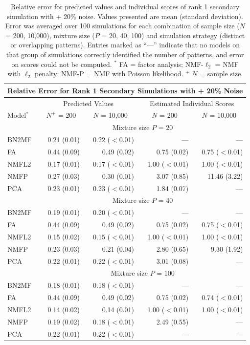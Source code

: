 \clearpage
\begingroup
\renewcommand{\arraystretch}{1.35}
\begin{table}[!htbp] \centering 
  \caption{Relative error for predicted values and individual scores of rank 1 secondary simulation with + 20\% noise. Values presented are mean (standard deviation). Error was averaged over 100 simulations for each combination of sample size ($N$ = 200, 10,000), mixture size ($P$ = 20, 40, 100) and simulation strategy (distinct or overlapping patterns). Entries marked as ``---'' indicate that no models on that group of simulations correctly identified the number of patterns, and error on scores could not be computed. $^*$ FA = factor analysis; NMF-$\ell_2$ = NMF with $\ell_2$ penalty; NMF-P = NMF with Poisson likelihood. $^+$ $N$ = sample size.}
  \label{table:sup1} 
 \addtolength{\tabcolsep}{-2pt}
\begin{tabular}{lrr|rr}
\multicolumn{5}{c}{Relative Error for Rank 1 Secondary Simulations with + 20\% Noise} \\
\hline 
\hline  
& \multicolumn{2}{c}{Predicted Values} & \multicolumn{2}{c}{Estimated Individual Scores} \\
\hline
\hline  
Model$^*$ & \multicolumn{1}{c}{$N^+$ = 200} & \multicolumn{1}{c}{$N$ = 10,000} & \multicolumn{1}{c}{$N$ = 200} & \multicolumn{1}{c}{$N$ = 10,000} \\
\hline
\hline  
& \multicolumn{4}{c}{Mixture size $P$ = 20} \\
\hline
BN2MF & 0.21 (0.01) & 0.22 ($<$0.01) & --- & --- \\ 
FA & 0.44 (0.09) & 0.49 (0.02) & 0.75 (0.02) & 0.75 ($<$0.01) \\ 
NMFL2 & 0.17 (0.01) & 0.17 ($<$0.01) & 1.00 ($<$0.01) & 1.00 ($<$0.01) \\ 
NMFP & 0.27 (0.03) & 0.30 (0.01) & 3.07 (0.85) & 11.46 (3.22) \\ 
PCA & 0.23 (0.01) & 0.23 ($<$0.01) & 1.84 (0.07) & --- \\ 
\hline 
& \multicolumn{4}{c}{Mixture size $P$ = 40} \\
\hline 
BN2MF & 0.19 (0.01) & 0.20 ($<$0.01) & --- & --- \\ 
FA & 0.44 (0.09) & 0.49 (0.02) & 0.75 (0.02) & 0.75 ($<$0.01) \\ 
NMFL2 & 0.15 (0.02) & 0.15 ($<$0.01) & 1.00 ($<$0.01) & 1.00 ($<$0.01) \\ 
NMFP & 0.23 (0.03) & 0.21 (0.04) & 2.80 (0.65) & 9.30 (1.92) \\ 
PCA & 0.22 (0.01) & 0.22 ($<$0.01) & 3.01 (0.08) & --- \\ 
\hline 
& \multicolumn{4}{c}{Mixture size $P$ = 100} \\
\hline 
BN2MF & 0.18 (0.01) & 0.18 ($<$0.01) & --- & --- \\ 
FA & 0.44 (0.09) & 0.49 (0.02) & 0.75 (0.02) & 0.74 ($<$0.01) \\ 
NMFL2 & 0.14 (0.02) & 0.14 (0.01) & 1.00 ($<$0.01) & 1.00 ($<$0.01) \\ 
NMFP & 0.19 (0.02) & 0.18 ($<$0.01) & 2.49 (0.55) & --- \\ 
PCA & 0.22 (0.01) & 0.22 ($<$0.01) & --- & --- \\ 
\hline
\hline  
\end{tabular}
\end{table}
